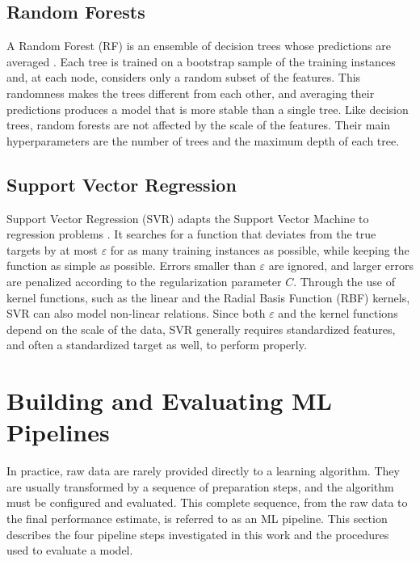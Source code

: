 \subsection{Random Forests}

A Random Forest (RF) is an ensemble of decision trees whose predictions are
averaged \cite{breiman2001}. Each tree is trained on a bootstrap sample of the
training instances and, at each node, considers only a random subset of the
features. This randomness makes the trees different from each other, and
averaging their predictions produces a model that is more stable than a single
tree. Like decision trees, random forests are not affected by the scale of the
features. Their main hyperparameters are the number of trees and the maximum
depth of each tree.

\subsection{Support Vector Regression}

Support Vector Regression (SVR) adapts the Support Vector Machine to regression
problems \cite{drucker1997,smola2004}. It searches for a function that deviates
from the true targets by at most $\varepsilon$ for as many training instances as
possible, while keeping the function as simple as possible. Errors smaller than
$\varepsilon$ are ignored, and larger errors are penalized according to the
regularization parameter $C$. Through the use of kernel functions, such as the
linear and the Radial Basis Function (RBF) kernels, SVR can also model non-linear
relations. Since both $\varepsilon$ and the kernel functions depend on the scale
of the data, SVR generally requires standardized features, and often a
standardized target as well, to perform properly.

\section{Building and Evaluating ML Pipelines}
\label{sec:fund-pipeline}

In practice, raw data are rarely provided directly to a learning algorithm.
They are usually transformed by a sequence of preparation steps, and the
algorithm must be configured and evaluated. This complete sequence, from the raw
data to the final performance estimate, is referred to as an ML pipeline. This
section describes the four pipeline steps investigated in this work and the
procedures used to evaluate a model.

